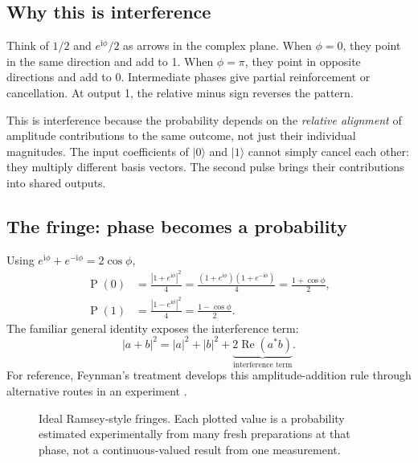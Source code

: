 \documentclass[11pt,a4paper]{article}
\newcommand{\ket}[1]{\lvert #1\rangle}
\newcommand{\ii}{\mathrm{i}}
\newcommand{\Prob}{\mathop{\mathrm{P}}}
\begin{document}
\subsection{Why this is interference}
Think of $1/2$ and $e^{\ii\phi}/2$ as arrows in the complex plane. When $\phi=0$, they point in the same direction and add to 1. When $\phi=\pi$, they point in opposite directions and add to 0. Intermediate phases give partial reinforcement or cancellation. At output 1, the relative minus sign reverses the pattern.

This is interference because the probability depends on the \emph{relative alignment} of amplitude contributions to the same outcome, not just their individual magnitudes. The input coefficients of $\ket{0}$ and $\ket{1}$ cannot simply cancel each other: they multiply different basis vectors. The second pulse brings their contributions into shared outputs.

\newpage
\subsection{The fringe: phase becomes a probability}
Using $e^{\ii\phi}+e^{-\ii\phi}=2\cos\phi$,
\begin{align}
\Prob(0)&=\frac{|1+e^{\ii\phi}|^2}{4}
=\frac{(1+e^{\ii\phi})(1+e^{-\ii\phi})}{4}
=\boxed{\frac{1+\cos\phi}{2}},\\
\Prob(1)&=\frac{|1-e^{\ii\phi}|^2}{4}
=\boxed{\frac{1-\cos\phi}{2}}.
\end{align}
The familiar general identity exposes the interference term:
\[
|a+b|^2=|a|^2+|b|^2+\underbrace{2\operatorname{Re}(a^*b)}_{\text{interference term}}.
\]
For reference, Feynman's treatment develops this amplitude-addition rule through alternative routes in an experiment \cite{feynman}.

\begin{figure}[!ht]
\centering
{}
\caption{Ideal Ramsey-style fringes. Each plotted value is a probability estimated experimentally from many fresh preparations at that phase, not a continuous-valued result from one measurement.}
\end{figure}
\end{document}
